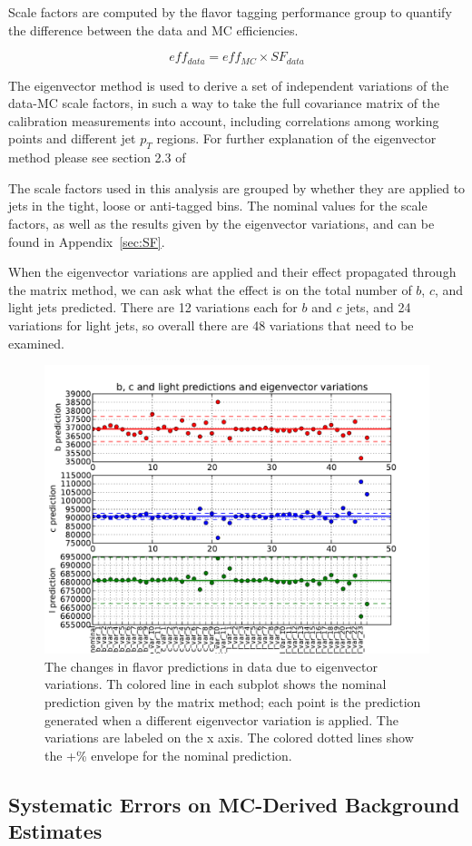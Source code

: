 Scale factors are computed by the flavor tagging performance group to quantify the
difference between the data and MC efficiencies.

    \begin{equation}
        eff_{data}=eff_{MC}\times SF_{data}
    \end{equation}


The eigenvector method is used to derive a set of independent variations of the data-MC scale
factors, in such a way to take the full covariance matrix of the calibration measurements
into account, including correlations among working points and different jet $p_{T}$ regions.
For further explanation of the eigenvector method please see section 2.3 of%

The scale factors used in this analysis are grouped by whether they are applied to jets in the
tight, loose or anti-tagged bins.  The nominal values for the scale factors, as well as the results
given by the eigenvector variations, and can be found in Appendix~\ref{sec:SF}.

When the eigenvector variations are applied and their effect propagated through the matrix method,
we can ask what the effect is on the total number of $b$, $c$, and light jets predicted.
There are 12 variations each for $b$ and $c$ jets, and 24 variations for light jets, so
overall there are 48 variations that need to be examined.

\begin{figure}[hbt]
  \includegraphics[width=0.98\linewidth]{Systematics/eigenvector_variations.pdf}
  \caption{The changes in flavor predictions in data due to eigenvector variations.  Th
    colored line in each subplot shows the nominal prediction given by the matrix method;
    each point is the prediction generated when a different eigenvector variation is applied.
    The variations are labeled on the x axis.  The colored dotted lines show the +\%
    envelope for the nominal prediction.}
  \label{fig:eigenvector_variations}
\end{figure}

\subsection{Systematic Errors on MC-Derived Background Estimates}





